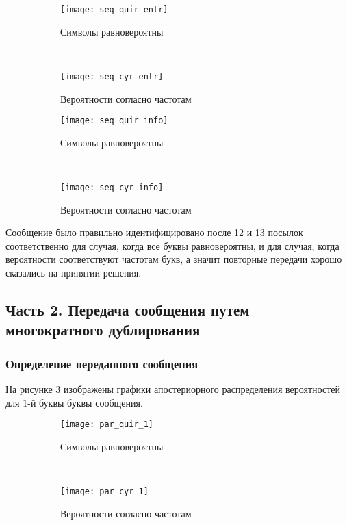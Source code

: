 \begin{figure}[H]
\begin{center}
	\begin{subfigure}[b]{0.45\textwidth}
		\texttt{[image: seq\_quir\_entr]}
		\caption{Символы равновероятны}
	\end{subfigure}
	~
	\begin{subfigure}[b]{0.45\textwidth}
		\texttt{[image: seq\_cyr\_entr]}
		\caption{Вероятности согласно частотам}
	\end{subfigure}
	\caption{}
	\label{pic:3:19}
\end{center}
\end{figure}

\begin{figure}[H]
\begin{center}
	\begin{subfigure}[b]{0.45\textwidth}
		\texttt{[image: seq\_quir\_info]}
		\caption{Символы равновероятны}
	\end{subfigure}
	~
	\begin{subfigure}[b]{0.45\textwidth}
		\texttt{[image: seq\_cyr\_info]}
		\caption{Вероятности согласно частотам}
	\end{subfigure}
	\caption{}
	\label{pic:3:20}
\end{center}
\end{figure}

Сообщение было правильно идентифицировано после 12 и 13 посылок соответственно для случая, когда все буквы равновероятны, и для случая, когда вероятности соответствуют частотам букв, а значит повторные передачи хорошо сказались на принятии решения.

\subsection{Часть 2. Передача сообщения путем многократного дублирования}

\subsubsection{Определение переданного сообщения}

На рисунке \ref{pic:3:21} изображены графики апостериорного распределения вероятностей для $1$-й буквы буквы сообщения.

\begin{figure}[H]
\begin{center}
	\begin{subfigure}[b]{0.45\textwidth}
		\texttt{[image: par\_quir\_1]}
		\caption{Символы равновероятны}
	\end{subfigure}
	~
	\begin{subfigure}[b]{0.45\textwidth}
		\texttt{[image: par\_cyr\_1]}
		\caption{Вероятности согласно частотам}
	\end{subfigure}
	\caption{}
	\label{pic:3:21}
\end{center}
\end{figure}

